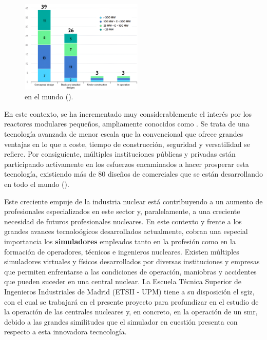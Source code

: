     \begin{figure}
      \vspace{-0.5cm}
      \centering
      \includegraphics[width=0.52\textwidth]{content/figures/global_smr_projects2.png}
      \caption{ en el mundo (\cite{iea_global_smr_projects}).}
      \label{fig:global_smr_projects}
      \vspace{-1cm}
    \end{figure}

    En este contexto, se ha incrementado muy considerablemente el interés por los reactores modulares pequeños, ampliamente conocidos como \textbf{\emph{}}. Se trata de una tecnología avanzada de menor escala que la convencional que ofrece grandes ventajas en lo que a coste, tiempo de construcción, seguridad y versatilidad se refiere. Por consiguiente, múltiples instituciones públicas y privadas están participando activamente en los esfuerzos encaminados a hacer prosperar esta tecnología, existiendo más de 80 diseños de  comerciales que se están desarrollando en todo el mundo (\cite{smr_oiea}).




    
\newpage 

Este creciente empuje de la industria nuclear está contribuyendo a un aumento de profesionales especializados en este sector y, paralelamente, a una creciente necesidad de futuros profesionales nucleares. En este contexto y frente a los grandes avances tecnoloógicos desarrollados actualmente, cobran una especial importancia los \textbf{simuladores} empleados tanto en la profesión como en la formación de operadores, técnicos e ingenieros nucleares. Existen múltiples simuladores virtuales y físicos desarrollados por diversas instituciones y empresas que permiten enfrentarse a las condiciones de operación, maniobras y accidentes que pueden suceder en una central nuclear. La Escuela Técnica Superior de Ingenieros Industriales de Madrid (ETSII - UPM) tiene a su disposición el \acrfull{sgiz}, con el cual se trabajará en el presente proyecto para profundizar en el estudio de la operación de las centrales nucleares y, en concreto, en la operación de un \acrshort{smr}, debido a las grandes similitudes que el simulador en cuestión presenta con respecto a esta innovadora tecncología.

